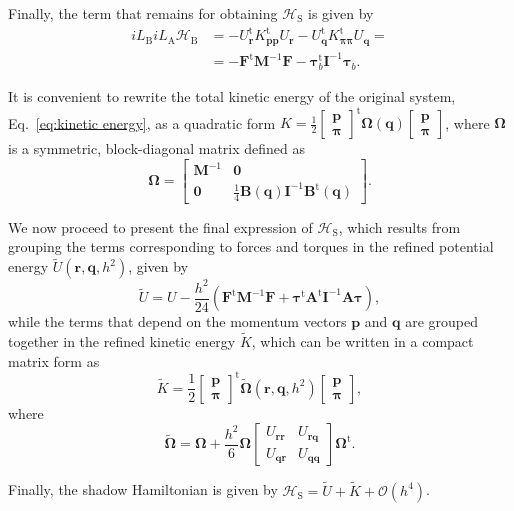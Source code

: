 \documentclass[
journal=jctcce,
layout=twocolumn
]{achemso}
\newcommand{\mt}[1]{\boldsymbol{\mathbf{#1}}}   %
\newcommand{\vt}[1]{\boldsymbol{\mathbf{#1}}}   %
\newcommand{\tr}[1]{#1^\text{t}}                %
\newcommand{\Ham}[1]{{\mathcal H}_\text{#1}}    %
\newcommand{\Liu}[1]{i\!L_\text{#1}}            %
\newcommand{\timestep}{h}
\newcommand{\refined}[1]{\widetilde{#1}}
\begin{document}
Finally, the term that remains for obtaining $\Ham{S}$ is given by
\begin{align*}
\Liu B \Liu A \Ham B &= -\tr{U_{\vt r}} \tr{K_{\vt p \vt p}} U_{\vt r} - \tr{U_{\vt q}} \tr{K_{\vt \pi \vt \pi}} U_{\vt q} = \\
&= -\tr{\vt F} {\mt M}^{-1} {\vt F} - \tr{\vt \tau}_b {\mt I}^{-1} {\vt \tau}_b.
\end{align*}

It is convenient to rewrite the total kinetic energy of the original system, Eq.~\eqref{eq:kinetic energy}, as a quadratic form $K = \frac{1}{2}\tr{[\substack{\vt p \\ \vt \pi}]} {\mt \Omega}(\vt q) [\substack{\vt p \\ \vt \pi}]$, where $\mt \Omega$ is a symmetric, block-diagonal matrix defined as
\begin{equation}
\label{eq:block-diagonal inverse mass tensor}
{\mt \Omega} = \left[\begin{array}{cc}
{\mt M}^{-1} & \mt 0 \\
\mt 0 & \frac{1}{4} {\mt B}(\vt q) {\mt I}^{-1} \tr{\mt B}(\vt q)
\end{array}\right].
\end{equation}

We now proceed to present the final expression of $\Ham{S}$, which results from grouping the terms corresponding to forces and torques in the refined potential energy $\refined U(\vt r, \vt q, h^2)$, given by
\begin{equation*}
\refined U = U - \frac{\timestep^2}{24} \left( \tr{\vt F} {\mt M}^{-1} {\vt F} + \tr{\vt \tau} \tr{\mt A} {\mt I}^{-1} {\mt A} {\vt \tau} \right),
\end{equation*}
while the terms that depend on the momentum vectors $\vt p$ and $\vt q$ are grouped together in the refined kinetic energy $\refined K$, which can be written in a compact matrix form as
\begin{equation*}
\refined K = \frac{1}{2} \tr{ \left[\begin{array}{c} \vt p \\ \vt \pi \end{array}\right]} \refined{\mathbf \Omega}(\vt r, \vt q, h^2) \left[\begin{array}{c} \vt p \\ \vt \pi \end{array}\right],
\end{equation*}
where
\begin{equation*}
\refined{\mt \Omega} = {\mt \Omega} + \frac{\timestep^2}{6} {\mt \Omega} \left[\begin{array}{cc}
U_{\vt r \vt r} & U_{\vt r \vt q} \\
U_{\vt q \vt r} & U_{\vt q \vt q}
\end{array}\right] \tr{\mt \Omega}.
\end{equation*}

Finally, the shadow Hamiltonian is given by $\Ham{S} = {\refined U} + {\refined K} + {\mathcal O}(\timestep^4)$.

\suppinfo


\end{document}

